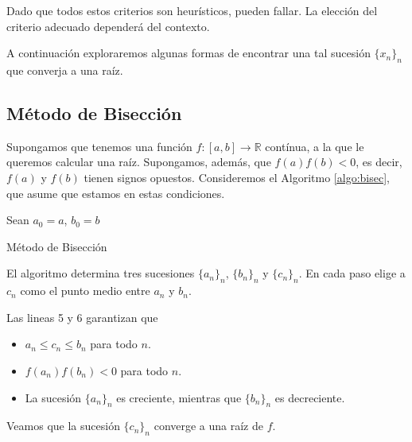 Dado que todos estos criterios son heurísticos, pueden fallar. La elección del criterio adecuado dependerá del contexto.

A continuación exploraremos algunas formas de encontrar una tal sucesión $\{x_n\}_n$ que converja a una raíz.

\subsection{Método de Bisección}

Supongamos que tenemos una función $f:[a, b] \to \mathbb{R}$ contínua, a la que le queremos calcular una raíz. Supongamos, además, que $f(a)f(b) < 0$, es decir, $f(a)$ y $f(b)$ tienen signos opuestos. Consideremos el Algoritmo \ref{algo:bisec}, que asume que estamos en estas condiciones.

\begin{algorithm}
\label{algo:bisec}
\DontPrintSemicolon



Sean $a_0 = a$, $b_0 = b$\;

\caption[]{Método de Bisección}
\end{algorithm}

El algoritmo determina tres sucesiones $\{a_n\}_n$, $\{b_n\}_n$ y $\{c_n\}_n$. En cada paso elige a $c_n$ como el punto medio entre $a_n$ y $b_n$. 

\begin{obs}
Las lineas 5 y 6 garantizan que

\begin{itemize}
\item $a_n \leq c_n \leq b_n$ para todo $n$.

\item $f(a_n)f(b_n) < 0$ para todo $n$.

\item La sucesión $\{a_n\}_n$ es creciente, mientras que $\{b_n\}_n$ es decreciente.
\end{itemize}
\end{obs}

Veamos que la sucesión $\{c_n\}_n$ converge a una raíz de $f$.

